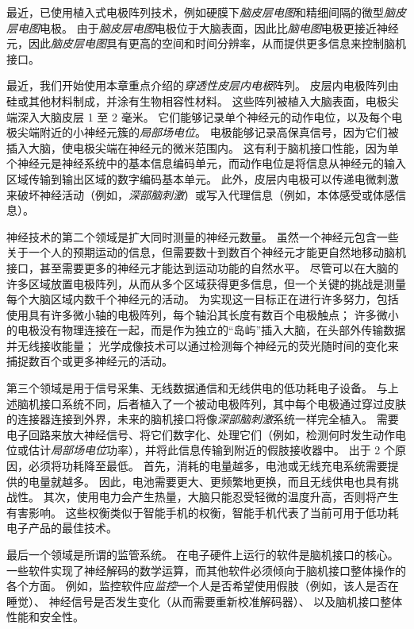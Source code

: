 最近，已使用植入式电极阵列技术，例如硬膜下\textit{脑皮层电图}和精细间隔的微型\textit{脑皮层电图}电极。
由于\textit{脑皮层电图}电极位于大脑表面，因此比\textit{脑电图}电极更接近神经元，因此\textit{脑皮层电图}具有更高的空间和时间分辨率，从而提供更多信息来控制脑机接口。


最近，我们开始使用本章重点介绍的\textit{穿透性皮层内电极}阵列。
皮层内电极阵列由硅或其他材料制成，并涂有生物相容性材料。
这些阵列被植入大脑表面，电极尖端深入大脑皮层 1 至 2 毫米。
它们能够记录单个神经元的动作电位，以及每个电极尖端附近的小神经元簇的\textit{局部场电位}。
电极能够记录高保真信号，因为它们被插入大脑，使电极尖端在神经元的微米范围内。
这有利于脑机接口性能，因为单个神经元是神经系统中的基本信息编码单元，而动作电位是将信息从神经元的输入区域传输到输出区域的数字编码基本单元。
此外，皮层内电极可以传递电微刺激来破坏神经活动（例如，\textit{深部脑刺激}）或写入代理信息（例如，本体感受或体感信息）。


神经技术的第二个领域是扩大同时测量的神经元数量。
虽然一个神经元包含一些关于一个人的预期运动的信息，但需要数十到数百个神经元才能更自然地移动脑机接口，甚至需要更多的神经元才能达到运动功能的自然水平。
尽管可以在大脑的许多区域放置电极阵列，从而从多个区域获得更多信息，但一个关键的挑战是测量每个大脑区域内数千个神经元的活动。
为实现这一目标正在进行许多努力，包括使用具有许多微小轴的电极阵列，每个轴沿其长度有数百个电极触点；
许多微小的电极没有物理连接在一起，而是作为独立的“岛屿”插入大脑，在头部外传输数据并无线接收能量；
光学成像技术可以通过检测每个神经元的荧光随时间的变化来捕捉数百个或更多神经元的活动。


第三个领域是用于信号采集、无线数据通信和无线供电的低功耗电子设备。
与上述脑机接口系统不同，后者植入了一个被动电极阵列，其中每个电极通过穿过皮肤的连接器连接到外界，未来的脑机接口将像\textit{深部脑刺激}系统一样完全植入。
需要电子回路来放大神经信号、将它们数字化、处理它们（例如，检测何时发生动作电位或估计\textit{局部场电位}功率），并将此信息传输到附近的假肢接收器中。
出于 2 个原因，必须将功耗降至最低。
首先，消耗的电量越多，电池或无线充电系统需要提供的电量就越多。
因此，电池需要更大、更频繁地更换，而且无线供电也具有挑战性。
其次，使用电力会产生热量，大脑只能忍受轻微的温度升高，否则将产生有害影响。
这些权衡类似于智能手机的权衡，智能手机代表了当前可用于低功耗电子产品的最佳技术。


最后一个领域是所谓的监管系统。
在电子硬件上运行的软件是脑机接口的核心。 
一些软件实现了神经解码的数学运算，而其他软件必须倾向于脑机接口整体操作的各个方面。
例如，监控软件应\textit{监控}一个人是否希望使用假肢（例如，该人是否在睡觉）、
神经信号是否发生变化（从而需要重新校准解码器）、
以及脑机接口整体性能和安全性。


